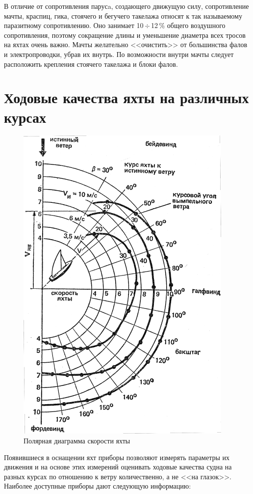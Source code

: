 \documentclass[a4paper, 12pt, twoside, final, book, russian, fittopage, cyremdash]{ncc}
\newcommand{\otdo}{\,\ensuremath{\div}\,}
\begin{document}
В отличие от сопротивления парусa, создающего движущую силу, сопротивление мачты, краспиц, гика, стоячего и бегучего такелажа относят к так называемому паразитному сопротивлению. Оно занимает 10\otdo 12\,\% общего воздушного сопротивления, поэтому сокращение длины и уменьшение диаметра всех тросов на яхтах очень важно. Мачты желательно <<очистить>> от большинства фалов и электропроводки, убрав их внутрь. По возможности внутри мачты следует расположить крепления стоячего такелажа и блоки фалов.

\section{Ходовые качества яхты на различных курсах}

\begin{figure}[htb]
  \centering
  \includegraphics[scale=1.2]{0031P}
  \caption{Полярная диаграмма скорости яхты}
  \label{fig:31}
\end{figure}

Появившиеся в оснащении яхт приборы позволяют измерять параметры их движения и на основе этих измерений оценивать ходовые качества судна на разных курсах по отношению к ветру количественно, а не <<на глазок>>. Наиболее доступные приборы дают следующую информацию:
\end{document}
